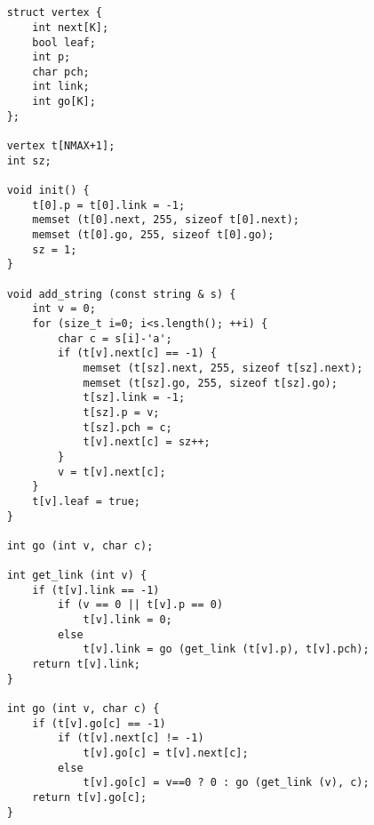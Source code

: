 \documentclass{article}
\begin{document}
\section{}
\begin{verbatim}
    struct vertex {
        int next[K];
        bool leaf;
        int p;
        char pch;
        int link;
        int go[K];
    };
     
    vertex t[NMAX+1];
    int sz;
     
    void init() {
        t[0].p = t[0].link = -1;
        memset (t[0].next, 255, sizeof t[0].next);
        memset (t[0].go, 255, sizeof t[0].go);
        sz = 1;
    }
     
    void add_string (const string & s) {
        int v = 0;
        for (size_t i=0; i<s.length(); ++i) {
            char c = s[i]-'a';
            if (t[v].next[c] == -1) {
                memset (t[sz].next, 255, sizeof t[sz].next);
                memset (t[sz].go, 255, sizeof t[sz].go);
                t[sz].link = -1;
                t[sz].p = v;
                t[sz].pch = c;
                t[v].next[c] = sz++;
            }
            v = t[v].next[c];
        }
        t[v].leaf = true;
    }
     
    int go (int v, char c);
     
    int get_link (int v) {
        if (t[v].link == -1)
            if (v == 0 || t[v].p == 0)
                t[v].link = 0;
            else
                t[v].link = go (get_link (t[v].p), t[v].pch);
        return t[v].link;
    }
     
    int go (int v, char c) {
        if (t[v].go[c] == -1)
            if (t[v].next[c] != -1)
                t[v].go[c] = t[v].next[c];
            else
                t[v].go[c] = v==0 ? 0 : go (get_link (v), c);
        return t[v].go[c];
    }
\end{verbatim}
\end{document}
